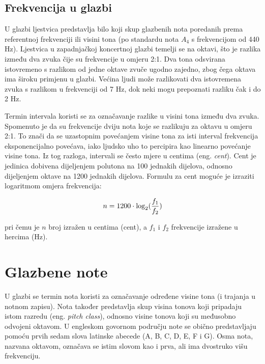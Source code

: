 \documentclass[times, utf8, diplomski, numeric]{fer}
\begin{document}
\section{Frekvencija u glazbi}
U glazbi ljestvica predstavlja bilo koji skup glazbenih nota poredanih prema referentnoj frekvenciji ili visini tona (po standardu nota $A_4$ s frekvencijom od 440 Hz). Ljestvica u zapadnjačkoj koncertnoj glazbi temelji se na oktavi, što je razlika između dva zvuka čije su frekvencije u omjeru 2:1. Dva tona odsvirana istovremeno s razlikom od jedne oktave zvuče ugodno zajedno, zbog čega oktava ima široku primjenu u glazbi. Većina ljudi može razlikovati dva istovremena zvuka s razlikom u frekvenciji od 7 Hz, dok neki mogu prepoznati razliku čak i do 2 Hz.

Termin intervala koristi se za označavanje razlike u visini tona između dva zvuka.\cite{prout2011harmony} Spomenuto je da su frekvencije dviju nota koje se razlikuju za oktavu u omjeru 2:1. To znači da se uzastopnim povećanjem visine tona za isti interval frekvencija eksponencijalno povećava, iako ljudsko uho to percipira kao linearno povećanje visine tona. Iz tog razloga, intervali se često mjere u centima (eng. \textit{cent}).\cite{benson2006music}
Cent je jedinica dobivena dijeljenjem polutona na 100 jednakih dijelova, odnosno dijeljenjem oktave na 1200 jednakih dijelova. Formulu za cent moguće je izraziti logaritmom omjera frekvencija:

\begin{equation}
	n = 1200 \cdot \log_2(\dfrac{f_1}{f_2}) \\ 
\end{equation}

pri čemu je $n$ broj izražen u centima (cent), a $f_1$ i $f_2$ frekvencije izražene u hercima (Hz).

\chapter{Glazbene note}
U glazbi se termin nota koristi za označavanje određene visine tona (i trajanja u notnom zapisu). Nota također predstavlja skup visina tonova koji pripadaju istom razredu (eng. \textit{pitch class}), odnosno visine tonova koji su međusobno odvojeni oktavom. U engleskom govornom području note se obično predstavljaju pomoću prvih sedam slova latinske abecede (A, B, C, D, E, F i G). Osma nota, nazvana oktavom, označava se istim slovom kao i prva, ali ima dvostruko višu frekvenciju.
\end{document}
